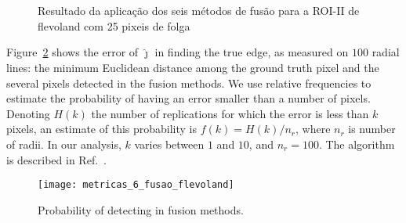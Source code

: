 \begin{figure}[hbt]
	\centering
     \\
     \\
     \caption{Resultado da aplicação dos seis métodos de fusão para a ROI-II de flevoland com 25 pixeis de folga}
     \label{fusion_sf_met}
\end{figure}
Figure~\ref{probability_edge_detc} shows the error of $\widehat\jmath$ in finding the true edge, as measured on $100$ radial lines: the minimum Euclidean distance among the ground truth pixel and the several pixels detected in the fusion methods.
We use relative frequencies to estimate the probability of having an error smaller than a number of pixels. 
Denoting $H(k)$ the number of replications for which the error is less than $k$ pixels, an estimate of this probability is $f(k)={H(k)}/{n_r}$, where $n_r$ is number of radii. 
In our analysis, $k$ varies between $1$ and $10$, and $n_r=100$. 
The algorithm is described in Ref.~\cite{fbgm}.

\begin{figure}[hbt]
\centering
	\texttt{[image: metricas\_6\_fusao\_flevoland]}
	\caption{Probability of detecting in fusion methods.}
\label{probability_edge_detc}
\end{figure}


